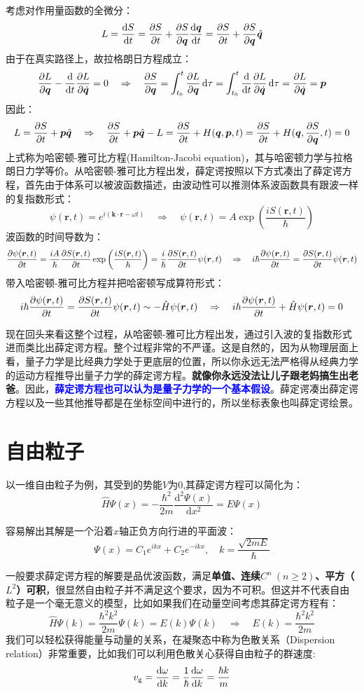 考虑对作用量函数的全微分：
\[L=\dv{S}{t}=\pdv{S}{t}+\pdv{S}{\bm{q}}\dv{\bm{q}}{t}=\pdv{S}{t}+\pdv{S}{\bm{q}}\hat{\bm{q}}\]
由于在真实路径上，故拉格朗日方程成立：
\[\pdv{L}{\bm{q}}-\dv{t}\pdv{L}{\dot{\bm{q}}}=0 \quad \Rightarrow \quad \pdv{S}{\bm{q}}=\int_{t_0}^{t}\pdv{L}{\bm{q}}\dd{\tau}=\int_{t_0}^{t}\dv{t}\pdv{L}{\dot{\bm{q}}}\dd{\tau}=\pdv{L}{\dot{\bm{q}}}=\bm{p}\]
因此：
\[L=\pdv{S}{t}+\bm{p}\hat{\bm{q}} \quad \Rightarrow \quad \pdv{S}{t}+\bm{p}\hat{\bm{q}}-L=\pdv{S}{t}+H(\bm{q},\bm{p},t)=\pdv{S}{t}+H(\bm{q},\pdv{S}{\bm{q}},t)=0\]
上式称为哈密顿-雅可比方程(Hamilton-Jacobi equation)，其与哈密顿力学与拉格朗日力学等价。从哈密顿-雅可比方程出发，薛定谔按照以下方式凑出了薛定谔方程，首先由于体系可以被波函数描述，由波动性可以推测体系波函数具有跟波一样的复指数形式：
\[\psi(\bm{r},t)=e^{i(\bm{k}\cdot\bm{r}-\omega t)} \quad \Rightarrow \quad \psi(\bm{r},t)=A\exp\left(\frac{iS(\bm{r},t)}{\hbar}\right)\]
波函数的时间导数为：
\[\pdv{\psi(\bm{r},t)}{t}=\frac{iA}{\hbar}\pdv{S(\bm{r},t)}{t}\exp\left(\frac{iS(\bm{r},t)}{\hbar}\right)=\frac{i}{\hbar}\pdv{S(\bm{r},t)}{t}\psi(\bm{r},t) \quad \Rightarrow \quad i\hbar\pdv{\psi(\bm{r},t)}{t}=\pdv{S(\bm{r},t)}{t}\psi(\bm{r},t)\]
带入哈密顿-雅可比方程并把哈密顿写成算符形式：
\[i\hbar\pdv{\psi(\bm{r},t)}{t}=\pdv{S(\bm{r},t)}{t}\psi(\bm{r},t)\sim-\hat{H}\psi(\bm{r},t) \quad \Rightarrow \quad i\hbar\pdv{\psi(\bm{r},t)}{t}+\hat{H}\psi(\bm{r},t)=0\]

现在回头来看这整个过程，从哈密顿-雅可比方程出发，通过引入波的复指数形式进而类比出薛定谔方程。整个过程非常的不严谨。这是自然的，因为从物理层面上看，量子力学是比经典力学处于更底层的位置，所以你永远无法严格得从经典力学的运动方程推导出量子力学的薛定谔方程。\textbf{就像你永远没法让儿子跟老妈搞生出老爸}。因此，\textcolor{blue}{\textbf{薛定谔方程也可以认为是量子力学的一个基本假设}}。薛定谔凑出薛定谔方程以及一些其他推导都是在坐标空间中进行的，所以坐标表象也叫薛定谔绘景。

\section{自由粒子}
以一维自由粒子为例，其受到的势能$V$为0,其薛定谔方程可以简化为：
\[\hat{H}\varPsi(x)=-\frac{\hbar^2}{2m}\frac{\mathrm{d}^2\varPsi(x)}{\mathrm{d}x^2}=E\varPsi(x)\]

容易解出其解是一个沿着$x$轴正负方向行进的平面波：
\[\varPsi(x)=C_1e^{ikx}+C_2e^{-ikx}, \quad k=\frac{\sqrt{2mE}}{\hbar}\]

一般要求薛定谔方程的解要是品优波函数，满足\textbf{单值、连续$C^n \ (n \geq 2)$、平方（$L^2$）可积}，很显然自由粒子并不满足这个要求，因为不可积。但这并不代表自由粒子是一个毫无意义的模型，比如如果我们在动量空间考虑其薛定谔方程有：
\[\hat{H}\varPsi(k)=\frac{\hbar^2k^2}{2m}\varPsi(k)=E(k)\varPsi(k) \quad \Rightarrow \quad E(k)=\frac{\hbar^2k^2}{2m}\]
我们可以轻松获得能量与动量的关系，在凝聚态中称为色散关系（Dispersion relation）非常重要，比如我们可以利用色散关心获得自由粒子的群速度:
\[v_{\rm{g}}=\dv{\omega}{k}=\frac{1}{\hbar}\dv{\omega}{k}=\frac{\hbar k}{m}\]
